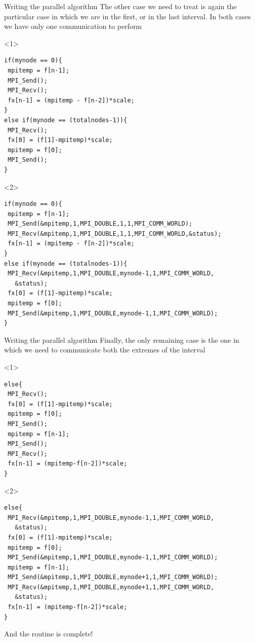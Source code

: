 \documentclass[xcolor={svgnames,usenames}]{beamer}
\begin{document}
\begin{frame}[fragile]{Writing the parallel algorithm}
The other case we need to treat is again the particular case in which we are in the first, or in the last interval. In both cases we have only one communication to perform
\begin{onlyenv}<1>
\begin{verbatim}
if(mynode == 0){
 mpitemp = f[n-1];
 MPI_Send();
 MPI_Recv();
 fx[n-1] = (mpitemp - f[n-2])*scale;
}
else if(mynode == (totalnodes-1)){
 MPI_Recv();
 fx[0] = (f[1]-mpitemp)*scale;
 mpitemp = f[0];
 MPI_Send();
}
\end{verbatim}
\end{onlyenv}
\begin{onlyenv}<2>
\begin{verbatim}
if(mynode == 0){
 mpitemp = f[n-1];
 MPI_Send(&mpitemp,1,MPI_DOUBLE,1,1,MPI_COMM_WORLD);
 MPI_Recv(&mpitemp,1,MPI_DOUBLE,1,1,MPI_COMM_WORLD,&status);
 fx[n-1] = (mpitemp - f[n-2])*scale;
}
else if(mynode == (totalnodes-1)){
 MPI_Recv(&mpitemp,1,MPI_DOUBLE,mynode-1,1,MPI_COMM_WORLD, 
   &status);
 fx[0] = (f[1]-mpitemp)*scale;
 mpitemp = f[0];
 MPI_Send(&mpitemp,1,MPI_DOUBLE,mynode-1,1,MPI_COMM_WORLD);
}
\end{verbatim}
\end{onlyenv}
\end{frame}

\begin{frame}[fragile]{Writing the parallel algorithm}
Finally, the only remaining case is the one in which we need to communicate both the extremes of the interval
\begin{onlyenv}<1>
\begin{verbatim}
else{
 MPI_Recv();
 fx[0] = (f[1]-mpitemp)*scale;
 mpitemp = f[0];
 MPI_Send();
 mpitemp = f[n-1];
 MPI_Send();
 MPI_Recv();
 fx[n-1] = (mpitemp-f[n-2])*scale;
}
\end{verbatim}
\end{onlyenv}
\begin{onlyenv}<2>
\begin{verbatim}
else{
 MPI_Recv(&mpitemp,1,MPI_DOUBLE,mynode-1,1,MPI_COMM_WORLD, 
   &status);
 fx[0] = (f[1]-mpitemp)*scale;
 mpitemp = f[0];
 MPI_Send(&mpitemp,1,MPI_DOUBLE,mynode-1,1,MPI_COMM_WORLD);
 mpitemp = f[n-1];
 MPI_Send(&mpitemp,1,MPI_DOUBLE,mynode+1,1,MPI_COMM_WORLD);
 MPI_Recv(&mpitemp,1,MPI_DOUBLE,mynode+1,1,MPI_COMM_WORLD, 
   &status);
 fx[n-1] = (mpitemp-f[n-2])*scale;
}
\end{verbatim}
And the routine is complete!
\end{onlyenv}
\end{frame}
\end{document}
